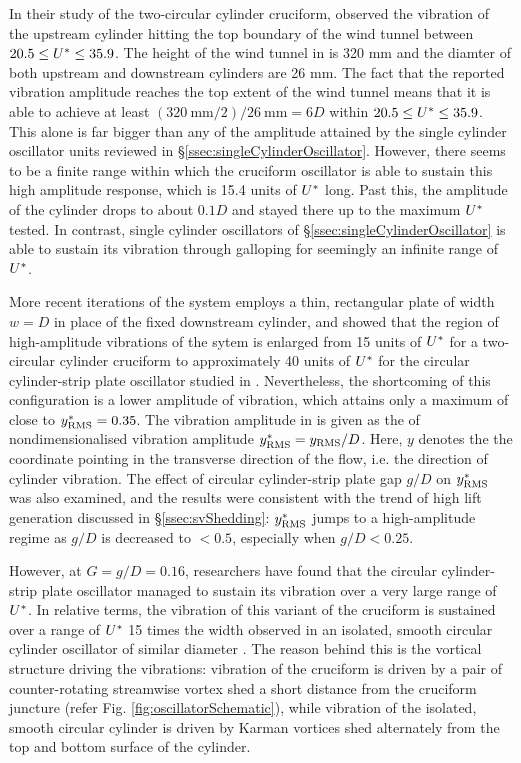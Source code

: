 \documentclass[oneside]{utmthesis}
\begin{document}
In their study of the two-circular cylinder cruciform, \citet{Shirakashi2001} observed the vibration of the upstream cylinder hitting the top boundary of the wind tunnel between $20.5 \leq U^{*} \leq 35.9$. The height of the wind tunnel in \citet{Shirakashi2001} is 320 mm and the diamter of both upstream and downstream cylinders are 26 mm. The fact that the reported vibration amplitude reaches the top extent of the wind tunnel means that it is able to achieve at least $(\SI{320}{\milli\metre}/2)/\SI{26}{\milli\metre} = 6D$ within $20.5 \leq U^{*} \leq 35.9$. This alone is far bigger than any of the amplitude attained by the single cylinder oscillator units reviewed in \S\ref{ssec:singleCylinderOscillator}. However, there seems to be a finite range within which the cruciform oscillator is able to sustain this high amplitude response, which is 15.4 units of $U^{*}$ long. Past this, the amplitude of the cylinder drops to about $0.1D$ and stayed there up to the maximum $U^{*}$ tested. In contrast, single cylinder oscillators of \S\ref{ssec:singleCylinderOscillator} is able to sustain its vibration through galloping for seemingly an infinite range of $U^{*}$.

More recent iterations of the system \citep{Koide2007,Kato2007} employs a thin, rectangular plate of width $w = D$ in place of the fixed downstream cylinder, and showed that the region of high-amplitude vibrations of the sytem is enlarged from 15 units of $U^{*}$ for a two-circular cylinder cruciform to approximately 40 units of $U^{*}$ for the circular cylinder-strip plate oscillator studied in \citet{Koide2007}. Nevertheless, the shortcoming of this configuration is a lower amplitude of vibration, which attains only a maximum of close to $y^{*}_{\text{RMS}} = 0.35$. The vibration amplitude in \citep{Koide2007,Kato2007} is given as the \rms{} of nondimensionalised vibration amplitude $y^{*}_{\text{RMS}} = y_{\text{RMS}}/D$. Here, $y$ denotes the the coordinate pointing in the transverse direction of the flow, i.e. the direction of cylinder vibration. The effect of circular cylinder-strip plate gap $g/D$ on $y^{*}_{\text{RMS}}$ was also examined, and the results were consistent with the trend of high lift generation discussed in \S\ref{ssec:svShedding}: $y^{*}_{\text{RMS}}$ jumps to a high-amplitude regime as $g/D$ is decreased to $< 0.5$, especially when $g/D < 0.25$. 

However, at $G = g/D = 0.16$, researchers have found that the circular cylinder-strip plate oscillator managed to sustain its vibration over a very large range of $U^{*}$. In relative terms, the vibration of this variant of the cruciform is sustained over a range of $U^{*}$ 15 times the width observed in an isolated, smooth circular cylinder oscillator of similar diameter \citep{Koide2009,Koide2013}. The reason behind this is the vortical structure driving the vibrations: vibration of the cruciform is driven by a pair of counter-rotating streamwise vortex shed a short distance from the cruciform juncture (refer Fig. \ref{fig:oscillatorSchematic}), while vibration of the isolated, smooth circular cylinder is driven by Karman vortices shed alternately from the top and bottom surface of the cylinder.
\end{document}
